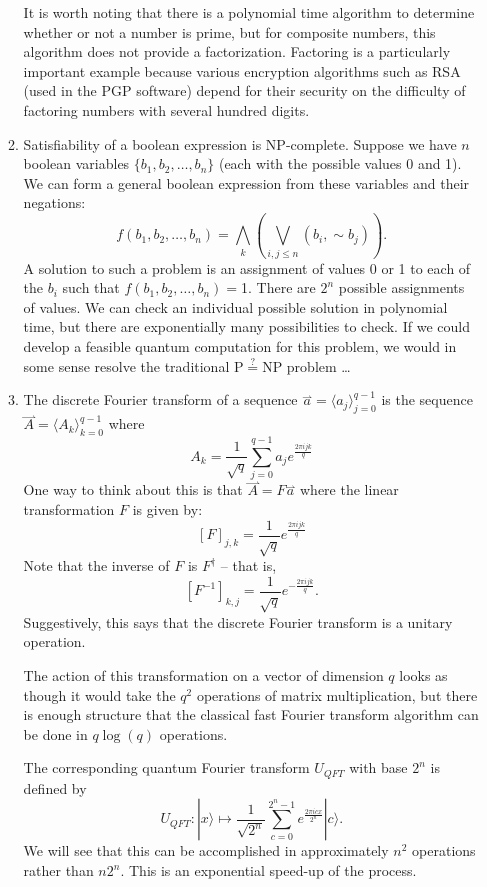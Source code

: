 \documentclass{article}
\def\pagedone{\newpage}
\def\ket#1{|{#1}\rangle}
\begin{document}
\begin{itemize}
\begin{enumerate}
It is worth noting that there is a polynomial time algorithm to determine whether or not a number is prime, but for composite numbers, this algorithm does not provide a factorization.  Factoring is a particularly important example because various encryption algorithms such as RSA (used in the PGP software) depend for their security on the difficulty of factoring numbers with several hundred digits.
\pagedone
		\item Satisfiability of a boolean expression is NP-complete.  Suppose we have $n$ boolean variables $\{b_1,b_2,\ldots,b_n\}$ (each with the possible values 0 and 1).  We can form a general boolean expression from these variables and their negations:
$$ f(b_1,b_2,\ldots,b_n) = \bigwedge_k(\bigvee_{i,j\le n}(b_i,\sim b_j)).$$
A solution to such a problem is an assignment of values 0 or 1 to each of the $b_i$ such that $f(b_1,b_2,\ldots,b_n) = $1.  There are $2^n$ possible assignments of values.  We can check an individual possible solution in polynomial time, but there are exponentially many possibilities to check.  If we could develop a feasible quantum computation for this problem, we would in some sense resolve the traditional P$\overset{?}=$NP problem \ldots
\pagedone
	\item The discrete Fourier transform of a sequence $\overset{\rightharpoonup}a=\langle a_j\rangle_{j=0}^{q-1}$ is the sequence $\overset{\rightharpoonup}A=\langle A_k\rangle_{k=0}^{q-1}$ where
$$A_k=\frac{1}{\sqrt{q}}\sum_{j=0}^{q-1}a_je^{\frac{2\pi ijk}{q}}$$
One way to think about this is that $\overset{\rightharpoonup}A=F\overset{\rightharpoonup}a$ where the linear transformation $F$ is given by:
$$[F]_{j,k}=\frac{1}{\sqrt{q}}e^{\frac{2\pi ijk}{q}}$$
Note that the inverse of $F$ is $F^\dag$ -- that is,
$$[F^{-1}]_{k,j}=\frac{1}{\sqrt{q}}e^{-\frac{2\pi ijk}{q}}.$$
Suggestively, this says that the discrete Fourier transform is a unitary operation.

The action of this transformation on a vector of dimension $q$ looks as though it would take the $q^2$ operations of matrix multiplication, but there is enough structure that the classical fast Fourier transform algorithm can be done in $q\log(q)$ operations.

The corresponding quantum Fourier transform $U_{QFT}$ with base $2^n$ is defined by
$$U_{QFT}: \ket{x} \mapsto \frac{1}{\sqrt{2^n}}\sum_{c=0}^{2^n-1}e^{\frac{2\pi icx}
{2^n}}\ket{c}.$$
We will see that this can be accomplished in approximately $n^2$ operations rather than $n2^n$.  This is an exponential speed-up of the process.

	\end{enumerate}
\pagedone
\end{itemize}
\end{document}
